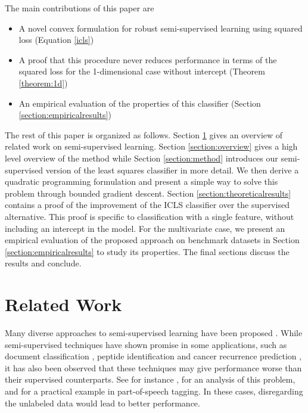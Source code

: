 \documentclass[twoside]{memoir}\usepackage[]{graphicx}\usepackage{xcolor}
\begin{document}
The main contributions of this paper are
\begin{itemize}
  \item A novel convex formulation for robust semi-supervised learning using squared loss (Equation \ref{icls})
  \item A proof that this procedure never reduces performance in terms of the squared loss for the 1-dimensional case without intercept (Theorem \ref{theorem:1d})
  \item An empirical evaluation of the properties of this classifier (Section \ref{section:empiricalresults})
\end{itemize}

The rest of this paper is organized as follows. 
Section \ref{section:relatedwork} gives an overview of related work on semi-supervised learning. 
Section \ref{section:overview} gives a high level overview of the method while Section \ref{section:method} introduces our semi-supervised version of the least squares classifier in more detail. 
We then derive a quadratic programming formulation and present a simple way to solve this problem through bounded gradient descent. 
Section \ref{section:theoreticalresults} contains a proof of the improvement of the ICLS classifier over the supervised alternative. This proof is specific to classification with a single feature, without including an intercept in the model. For the multivariate case, we present an empirical evaluation of the proposed approach on benchmark datasets in Section \ref{section:empiricalresults} to study its properties. The final sections discuss the results and conclude.

\section{Related Work} 
\label{section:relatedwork}
Many diverse approaches to semi-supervised learning have been proposed   \citep{Chapelle2006,Zhu2009}. While semi-supervised techniques have shown promise in some applications, such as document classification \citep{Nigam2000}, peptide identification \citep{Kall2007} and cancer recurrence prediction \citep{Shi2011}, it has also been observed that these techniques may give performance worse than their supervised counterparts. See for instance \citep{Cozman2006,Cozman2003}, for an analysis of this problem, and \citep{Elworthy1994} for a practical example in part-of-speech tagging.
In these cases, disregarding the unlabeled data would lead to better performance. 
\end{document}
